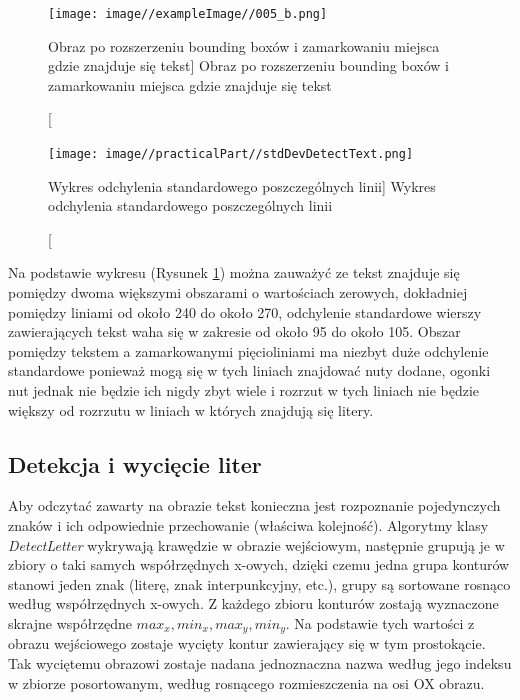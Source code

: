 \documentclass[a4paper,12pt]{article}
\newcommand\spacingIndent{2.2em}
\begin{document}
		        \begin{figure}[!ht]  
			        \begin{center}
				        \texttt{[image: image//exampleImage//005\_b.png]} 
			        \end{center}
			        \caption
    			        [Obraz po rozszerzeniu bounding boxów i zamarkowaniu miejsca gdzie znajduje się tekst]  
    			        {Obraz po rozszerzeniu bounding boxów i zamarkowaniu miejsca gdzie znajduje się tekst}
		        \end{figure} 
		    \newpage
		        \begin{figure}[!ht]  
			        \begin{center}
				        \texttt{[image: image//practicalPart//stdDevDetectText.png]} 
			        \end{center}
			        \caption
        			    [Wykres odchylenia standardowego poszczególnych linii]  
        			    {Wykres odchylenia standardowego poszczególnych linii}  
        			    \label{fig:stdDevLineTex}
		        \end{figure}
		    
		    Na podstawie wykresu (Rysunek \ref{fig:stdDevLineTex}) można zauważyć ze tekst znajduje się pomiędzy dwoma większymi obszarami o wartościach zerowych, dokładniej pomiędzy liniami od około 240 do około 270, odchylenie standardowe wierszy zawierających tekst waha się w zakresie od około 95 do około 105. Obszar pomiędzy tekstem a zamarkowanymi pięcioliniami ma niezbyt duże odchylenie standardowe ponieważ mogą się w tych liniach znajdować nuty dodane, ogonki nut jednak nie będzie ich nigdy zbyt wiele i rozrzut w tych liniach nie będzie większy od rozrzutu w liniach w których znajdują się litery.

        \subsection{Detekcja i wycięcie liter}
            \hspace{\spacingIndent} Aby odczytać zawarty na obrazie tekst konieczna jest rozpoznanie pojedynczych znaków i ich odpowiednie przechowanie (właściwa kolejność).            Algorytmy klasy \textit{DetectLetter} wykrywają krawędzie w obrazie wejściowym,     następnie grupują je w zbiory o taki samych współrzędnych x-owych, dzięki    czemu jedna grupa konturów stanowi jeden znak (literę, znak                 interpunkcyjny, etc.), grupy są sortowane rosnąco według współrzędnych      x-owych. Z każdego zbioru konturów zostają wyznaczone skrajne współrzędne    $ max_{x} , min_{x}, max_{y}, min_{y} $. Na podstawie tych wartości z       obrazu wejściowego zostaje wycięty kontur zawierający się w tym             prostokącie. Tak wyciętemu obrazowi zostaje nadana jednoznaczna nazwa       według jego indeksu w zbiorze posortowanym, według rosnącego rozmieszczenia na osi OX obrazu. 
    
\end{document}
